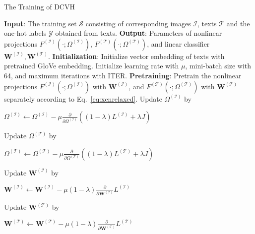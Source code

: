 \documentclass[10pt,twocolumn,letterpaper]{article}
\begin{document}
\begin{algorithm}
\caption{The Training of DCVH}\label{alg:dcvh}
\begin{algorithmic}[0]
\STATE \textbf{Input}: The training set $\mathcal{S}$ consisting of corresponding images $\mathcal{I}$, texts $\mathcal{T}$ and the one-hot labels $\mathcal{Y}$ obtained from texts.
\STATE \textbf{Output}: Parameters of nonlinear projections $F^{(\mathcal{I})}(\cdot;\Omega^{(\mathcal{I})})$, $F^{(\mathcal{T})}(\cdot;\Omega^{(\mathcal{T})})$, and linear classifier $\mathbf{W}^{(\mathcal{I})},\mathbf{W}^{(\mathcal{T})}$.
\STATE 
\STATE \textbf{Initialization}: Initialize vector embedding of texts with pretrained GloVe embedding. Initialize learning rate with $\mu$, mini-batch size with 64, and maximum iterations with ITER.
\STATE \textbf{Pretraining}: Pretrain the nonlinear projections $F^{(\mathcal{I})}(\cdot;\Omega^{(\mathcal{I})})$ with $\mathbf{W}^{(\mathcal{I})}$, and $F^{(\mathcal{T})}(\cdot;\Omega^{(\mathcal{T})})$ with $\mathbf{W}^{(\mathcal{T})}$ separately according to Eq.~\ref{eq:xenrelaxed}.
\STATE Update $\Omega^{(\mathcal{I})}$ by\\
				\begin{center}$\Omega^{(\mathcal{I})} \leftarrow \Omega^{(\mathcal{I})}-\mu \frac{\partial}{\partial \Omega^{(\mathcal{I})}}\left((1-\lambda)\mathit{L}^{(\mathcal{I})}+ \lambda \mathit{J}\right)$\end{center}
				
\STATE Update $\Omega^{(\mathcal{T})}$ by\\
				\begin{center}$\Omega^{(\mathcal{T})} \leftarrow \Omega^{(\mathcal{T})}-\mu \frac{\partial}{\partial \Omega^{(\mathcal{T})}}\left((1-\lambda)\mathit{L}^{(\mathcal{T})}+ \lambda \mathit{J}\right)$\end{center}
\STATE Update $\mathbf{W}^{(\mathcal{I})}$ by\\
				\begin{center}$\mathbf{W}^{(\mathcal{I})} \leftarrow \mathbf{W}^{(\mathcal{I})}-\mu(1-\lambda) \frac{\partial}{\partial \mathbf{W}^{(\mathcal{I})}}\mathit{L}^{(\mathcal{I})}$\end{center}
\STATE Update $\mathbf{W}^{(\mathcal{T})}$ by\\
				\begin{center}$\mathbf{W}^{(\mathcal{T})} \leftarrow \mathbf{W}^{(\mathcal{T})}-\mu(1-\lambda) \frac{\partial}{\partial \mathbf{W}^{(\mathcal{T})}}\mathit{L}^{(\mathcal{T})}$\end{center}
\ENDFOR
\end{algorithmic}
\end{algorithm}
\end{document}
